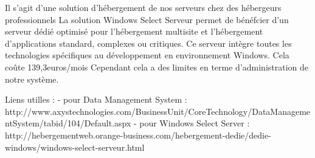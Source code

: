         {Il s'agit d'une solution d'hébergement de nos serveurs chez des hébergeurs professionnels}
        {La solution Windows Select Serveur permet de bénéfcier d’un serveur dédié optimisé pour l’hébergement multisite et l’hébergement d’applications standard, complexes ou critiques. Ce serveur intègre toutes les technologies spécifiques au développement en environnement Windows.}
        {}
        {Cela coûte 139,3euros/mois}
        {}
        {Cependant cela a des limites en terme d'administration de notre système.}


        Liens utilles : 
        - pour Data Management System : http://www.axystechnologies.com/BusinessUnit/CoreTechnology/DataManagementSystem/tabid/104/Default.aspx
        - pour Windows Select Server : http://hebergementweb.orange-business.com/hebergement-dedie/dedie-windows/windows-select-serveur.html

